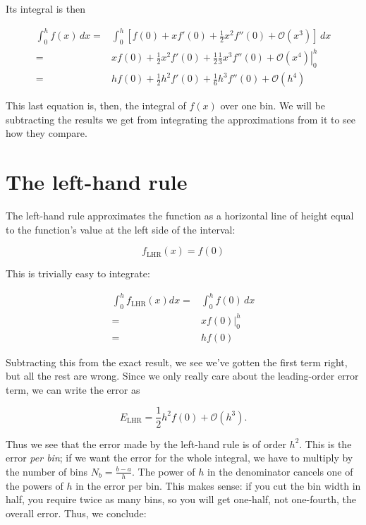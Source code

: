 \documentclass[12ampt]{article}
\begin{document}
Its integral is then

\begin{align}
  \int_0^h f(x) \,dx =& \int_0^h \left[ f(0) + xf'(0) + \frac{1}{2} x^2 f''(0) + \mathcal O(x^3) \right] \,dx \\
=& \left. xf(0) + \frac{1}{2}x^2f'(0) + \frac{1}{2}\frac{1}{3} x^3 f''(0) + \mathcal O(x^4) \right|^h_0 \\
  =& hf(0) + \frac{1}{2}h^2f'(0) + \frac{1}{6} h^3 f''(0) + \mathcal O(h^4) \label{eq-exact}
\end{align}

This last equation is, then, the integral of $f(x)$ over one bin. We will be subtracting the results we get from integrating the approximations from it to see how they compare.

\section{The left-hand rule}

The left-hand rule approximates the function as a horizontal line of height equal to the function's value at the left side of the interval:

\begin{equation}
  f_{\mathrm{LHR}}(x) = f(0)
\end{equation}

This is trivially easy to integrate:

\begin{align}
  \int_0^h f_{\mathrm{LHR}}(x) dx =& \int_0^h f(0) \, dx \\
  =& \left. xf(0) \right|^h_0 \\
  =&  hf(0) 
\end{align}

Subtracting this from the exact result, we see we've gotten the first term right, but all the rest are wrong. Since we only really care about the leading-order error term, 
we can write the error as

\begin{equation}
  E_{\mathrm{LHR}}=\frac{1}{2} h^2 f(0) + \mathcal O(h^3).
\end{equation}

Thus we see that the error made by the left-hand rule is of order $h^2$. This is the error {\it per bin}; if we want the error for the whole integral, we have to multiply
by the number of bins $N_b = \frac{b-a}{h}$. The power of $h$ in the denominator cancels one of the powers of $h$ in the error per bin. 
This makes sense: if you cut the bin width in half, you require twice as many bins, so you will get one-half, not one-fourth, the overall
error. Thus, we conclude:
\end{document}
